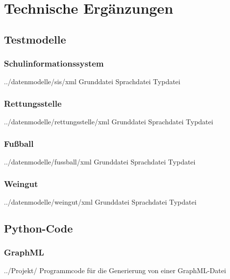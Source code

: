 \chapter{Technische Ergänzungen}

\section{Testmodelle}

\subsection{Schulinformationssystem}
\begin{FileList}{../datenmodelle/sis/xml}
	 Grunddatei 
	 Sprachdatei 
	 Typdatei 
\end{FileList}

\subsection{Rettungsstelle}
\begin{FileList}{../datenmodelle/rettungsstelle/xml}
	 Grunddatei 
	 Sprachdatei 
	 Typdatei 
\end{FileList}

\subsection{Fußball}
\begin{FileList}{../datenmodelle/fussball/xml}
	 Grunddatei 
	 Sprachdatei 
	 Typdatei 
\end{FileList}

\subsection{Weingut}
\begin{FileList}{../datenmodelle/weingut/xml}
	 Grunddatei 
	 Sprachdatei 
	 Typdatei 
\end{FileList}

\section{Python-Code}

\subsection{GraphML}
\begin{FileList}{../Projekt/}
	 Programmcode für die Generierung von einer GraphML-Datei
\end{FileList}

